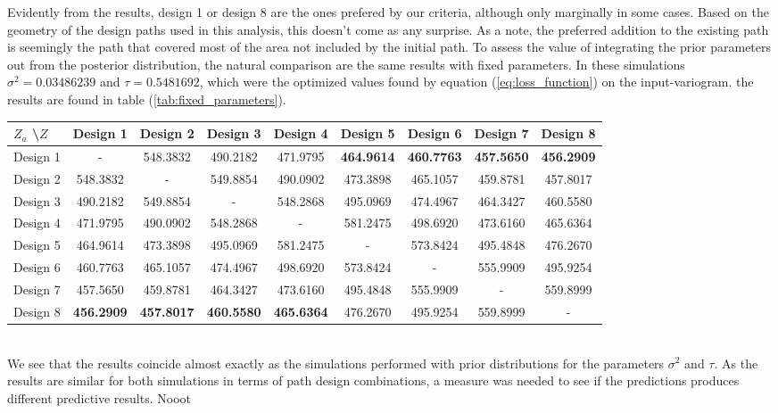 Evidently from the results, design 1 or design 8 are the ones prefered by our criteria, although only marginally in some cases. Based on the geometry of the design paths used in this analysis, this doesn't come as any surprise. As a note, the preferred addition to the existing path is seemingly the path that covered most of the area not included by the initial path. To assess the value of integrating the prior parameters out from the posterior distribution, the natural comparison are the same results with fixed parameters. In these simulations $\sigma^2 = 0.03486239$ and $\tau = 0.5481692$, which were the optimized values found by equation (\ref{eq:loss_function}) on the input-variogram. the results are found in table (\ref{tab:fixed_parameters}).

\begin{minipage}{\linewidth}
 \label{tab:fixed_parameters} 
\hspace{-35pt}
\begin{tabular}{ l || c | c | c | c | c | c | c | c } 
$Z_a$ \textbackslash  $Z$ & Design 1 & Design 2 & Design 3 & Design 4 & Design 5 & Design 6 & Design 7 & Design 8 \\ \hline \hline
Design 1 & - & 548.3832 & 490.2182 & 471.9795 & \textbf{464.9614} & \textbf{460.7763} & \textbf{457.5650} & \textbf{456.2909} \\
Design 2 & 548.3832 & - & 549.8854 & 490.0902 & 473.3898 & 465.1057 & 459.8781 & 457.8017 \\
Design 3 & 490.2182 & 549.8854 & - & 548.2868 & 495.0969 & 474.4967 & 464.3427 & 460.5580 \\
Design 4 & 471.9795 & 490.0902 & 548.2868 & - & 581.2475 & 498.6920 & 473.6160 & 465.6364 \\
Design 5 & 464.9614 & 473.3898 & 495.0969 & 581.2475 & - & 573.8424 & 495.4848 & 476.2670 \\
Design 6 & 460.7763 & 465.1057 & 474.4967 & 498.6920 & 573.8424 & - & 555.9909 & 495.9254 \\
Design 7 & 457.5650 & 459.8781 & 464.3427 & 473.6160 & 495.4848 & 555.9909 & - & 559.8999 \\
Design 8 & \textbf{456.2909} & \textbf{457.8017} & \textbf{460.5580} & \textbf{465.6364} & 476.2670 & 495.9254 & 559.8999 & -
\end{tabular}
\end{minipage}
\ \\
We see that the results coincide almost exactly as the simulations performed with prior distributions for the parameters $\sigma^2$ and $\tau$. As the results are similar for both simulations in terms of path design combinations, a measure was needed to see if the predictions produces different predictive results. Nooot

